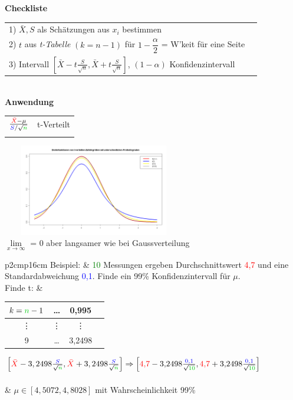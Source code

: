 \begin{minipage}{11cm}
	\textbf{Checkliste}\\
	\begin{tabular}{ll}
		1) $\bar{X}, S$ als Schätzungen aus $x_i$ bestimmen\\
		2) $t$ aus {\em t-Tabelle} $(k=n-1)$ für $1- \dfrac{\alpha}{2}$ = W'keit für eine Seite\\
		3) Intervall
		$\left[\bar{X}-t\frac{S}{\sqrt{n}},\bar{X}+t\frac{S}{\sqrt{n}}\right]$,
		$(1-\alpha)$ Konfidenzintervall
	\end{tabular}\\
	\textbf{Anwendung}\\
	\begin{tabular}{ll}
		$\frac{\textcolor{red}{\bar{X}}-\mu}{\textcolor{blue}{S}/\sqrt{\textcolor{green}{n}}}$
		& t-Verteilt\\ \\
	\end{tabular}

\end{minipage}
\begin{minipage}{10cm}
	\includegraphics[width=8cm,height=4cm]{./bilder/T-Verteilung.png}\\
	$\lim\limits_{x\rightarrow \infty}$ = 0 aber langsamer wie bei Gaussverteilung 
\end{minipage}

\begin{tabular}{p{2cm}p{16cm}}
	Beispiel: & \textcolor{green}{10} Messungen ergeben Durchschnittswert
	\textcolor{red}{4{,}7} und eine Standardabweichung \textcolor{blue}{0{,}1}.
	Finde ein 99\%  Konfidenzintervall für $\mu$.\\
	
	Finde t: & \begin{tabular}{| c | c | c | c |}
		\hline
		$k=\textcolor{green}{n}-1$ & \ldots & 0{,}995\\
		\hline
		\vdots & \vdots & \vdots \\
		\hline
		9 & \ldots & 3{,}2498\\
		\hline
	\end{tabular}
	
	$\left[\textcolor{red}{\bar{X}}-3,2498\frac{\textcolor{blue}{S}}{\sqrt{\textcolor{green}{n}}},
	\textcolor{red}{\bar{X}}+3,2498\frac{\textcolor{blue}{S}}{\sqrt{\textcolor{green}{n}}}\right]
	\Rightarrow 
	\left[{\color{red}4{,}7}-3{,}2498\frac{\textcolor{blue}{0{,}1}}{\sqrt{\textcolor{green}{10}}},
	\textcolor{red}{4{,}7}+3{,}2498\frac{\textcolor{blue}{0{,}1}}{\sqrt{\textcolor{green}{10}}}\right]$\\ \\
	& $\mu\in \left[4{,}5072, 4{,}8028\right]$ mit Wahrscheinlichkeit 99\%
\end{tabular}